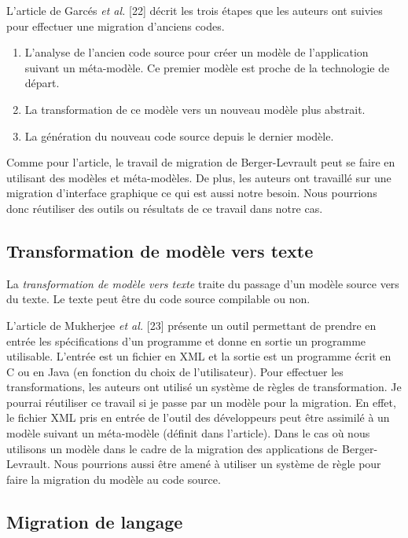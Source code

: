 \documentclass[11pt,]{article}
\providecommand{\tightlist}{%
  \setlength{\itemsep}{0pt}\setlength{\parskip}{0pt}}
\begin{document}
L'article de Garcés \emph{et al.} {[}22{]} décrit les trois étapes que
les auteurs ont suivies pour effectuer une migration d'anciens codes.

\begin{enumerate}
\def\labelenumi{\arabic{enumi}.}
\tightlist
\item
  L'analyse de l'ancien code source pour créer un modèle de
  l'application suivant un méta-modèle. Ce premier modèle est proche de
  la technologie de départ.
\item
  La transformation de ce modèle vers un nouveau modèle plus abstrait.
\item
  La génération du nouveau code source depuis le dernier modèle.
\end{enumerate}

Comme pour l'article, le travail de migration de Berger-Levrault peut se
faire en utilisant des modèles et méta-modèles. De plus, les auteurs ont
travaillé sur une migration d'interface graphique ce qui est aussi notre
besoin. Nous pourrions donc réutiliser des outils ou résultats de ce
travail dans notre cas.

\hypertarget{transformation-de-moduxe8le-vers-texte}{%
\subsection{Transformation de modèle vers
texte}\label{transformation-de-moduxe8le-vers-texte}}

La \emph{transformation de modèle vers texte} traite du passage d'un
modèle source vers du texte. Le texte peut être du code source
compilable ou non.

L'article de Mukherjee \emph{et al.} {[}23{]} présente un outil
permettant de prendre en entrée les spécifications d'un programme et
donne en sortie un programme utilisable. L'entrée est un fichier en XML
et la sortie est un programme écrit en C ou en Java (en fonction du
choix de l'utilisateur). Pour effectuer les transformations, les auteurs
ont utilisé un système de règles de transformation. Je pourrai
réutiliser ce travail si je passe par un modèle pour la migration. En
effet, le fichier XML pris en entrée de l'outil des développeurs peut
être assimilé à un modèle suivant un méta-modèle (définit dans
l'article). Dans le cas où nous utilisons un modèle dans le cadre de la
migration des applications de Berger-Levrault. Nous pourrions aussi être
amené à utiliser un système de règle pour faire la migration du modèle
au code source.

\hypertarget{migration-de-langage}{%
\subsection{Migration de langage}\label{migration-de-langage}}
\end{document}
